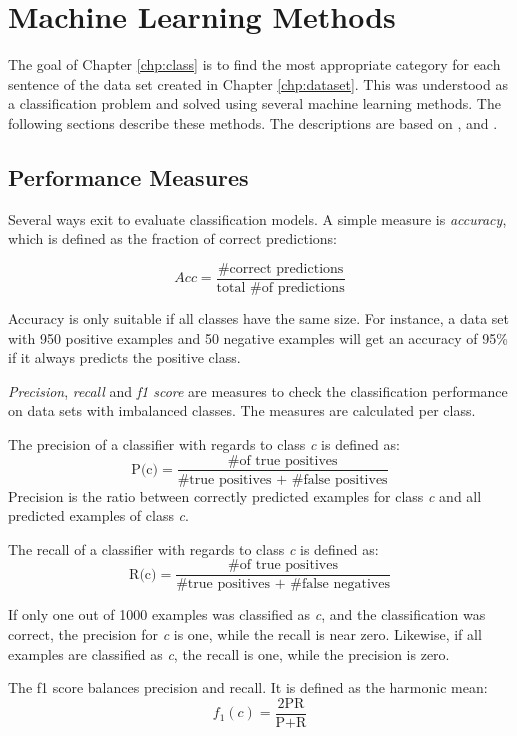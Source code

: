 \section{Machine Learning Methods}
The goal of Chapter \ref{chp:class} is to find the most appropriate category for each sentence of the data set created in Chapter \ref{chp:dataset}. This was understood as a classification problem and solved using several machine learning methods. The following sections describe these methods. The descriptions are based on \cite{mitchell1997machine}, \cite{friedman2001elements} and \cite{Goodfellow-et-al-2016}.


\subsection{Performance Measures}
Several ways exit to evaluate classification models. A simple measure is \emph{accuracy}, which is defined as the fraction of correct predictions:

\[ Acc = \frac{\text{\# correct predictions}}{\text{total \# of predictions}} \]

Accuracy is only suitable if all classes have the same size. For instance, a data set with 950 positive examples and 50 negative examples will get an accuracy of 95\% if it always predicts the positive class.


\emph{Precision}, \emph{recall} and \emph{f1 score} are measures to check the classification performance on data sets with imbalanced classes. The measures are calculated per class.

The precision of a classifier with regards to class \emph{c} is defined as:
\[ \text{P(c)} = \frac{\text{\# of true positives}}{\text{\# true positives + \# false positives}} \]
Precision is the ratio between correctly predicted examples for class \emph{c} and all predicted examples of class \emph{c}.


The recall of a classifier with regards to class \emph{c} is defined as:
\[ \text{R(c)} = \frac{\text{\# of true positives}}{\text{\# true positives + \# false negatives}} \]


If only one out of 1000 examples was classified as \emph{c}, and the classification was correct, the precision for \emph{c} is one, while the recall is near zero. Likewise, if all examples are classified as \emph{c}, the recall is one, while the precision is zero. 

The f1 score balances precision and recall. It is defined as the harmonic mean:
\[ f_{1}(c) = \frac{\text{2PR}}{\text{P+R}} \]


